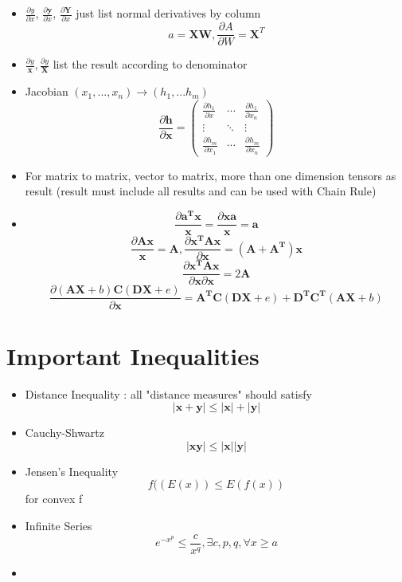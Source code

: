 \documentclass[11pt, openany]{book}              %
\begin{document}
\begin{itemize}
	\item $\frac{\partial y}{\partial x}$, $\frac{\partial \mathbf{y}}{\partial x}$, $\frac{\partial \mathbf{Y}}{\partial x}$ just list normal derivatives by column 
	$$a = \mathbf{XW}, \frac{\partial A}{\partial W} = \mathbf{X}^T$$
	\item $\frac{\partial y}{\mathbf{x}},\frac{\partial y}{\mathbf{X}}$ list the result according to denominator
	\item Jacobian $(x_1, ... , x_n) \rightarrow (h_1,...h_m)$
	$$\frac{\partial \mathbf{h}}{\partial \mathbf{x}} = 
	\begin{pmatrix} 
  				\frac{\partial h_1 }{\partial x} & \cdots & \frac{\partial h_1 }{\partial x_n}\\ 
  				\vdots & \ddots & \vdots \\
  				\frac{\partial{h_m}}{\partial x_1 } & \cdots & \frac{\partial h_m }{\partial x_n} 
			\end{pmatrix} $$
	\item For matrix to matrix, vector to matrix, more than one dimension tensors as result (result must include all results and can be used with Chain Rule)
	\item $$ \frac{\partial \mathbf{a^T x}}{\mathbf{x}} = \frac{\partial  \mathbf{xa}}{\mathbf{x}} = \mathbf{a}$$
	 $$ \frac{\partial \mathbf{A x}}{\mathbf{x}} = \mathbf{A},\frac{\partial \mathbf{ x^T A x}}{\partial{\mathbf{x}}}=( \mathbf{A} +  \mathbf{A^T} )\mathbf{x}$$ 
	 $$\frac{\partial \mathbf{ x^T A x}}{\partial{\mathbf{x}} \partial{\mathbf{x}}}
	 	= 2\mathbf{A} $$
	 $$\frac{\partial( \mathbf{AX} +  b) \mathbf{C} ( \mathbf{DX} + e)}{\partial{\mathbf{x}}} = \mathbf{A^TC}(\mathbf{DX} + e) + \mathbf{D^TC^T} ( \mathbf{AX} +  b) $$
\end{itemize}


\section{Important Inequalities}
\begin{itemize}
\item Distance Inequality : all "distance measures" should satisfy $$ |\mathbf{x} + \mathbf{y}| \leq |\mathbf{x}| + |\mathbf{y}|$$
\item Cauchy-Shwartz $$|\mathbf{xy}| \leq |\mathbf{x}||\mathbf{y}|$$
\item Jensen's Inequality $$f((E(x)) \leq E(f(x))$$ for convex f
\item Infinite Series $$ e^{-x^p} \leq \frac{c}{x^q}, \exists c,p,q, \forall x \geq a$$ 
\item 
\end{itemize}
\end{document}
